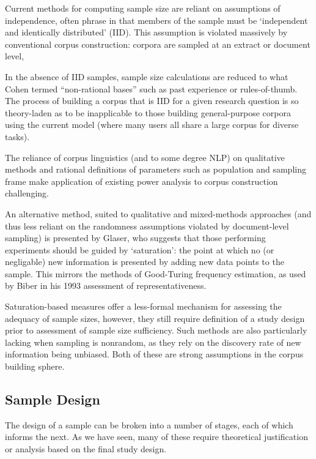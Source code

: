 Current methods for computing sample size are reliant on assumptions of independence, often phrase in that members of the sample must be `independent and identically distributed' (IID).  This assumption is violated massively by conventional corpus construction: corpora are sampled at an extract or document level, 

In the absence of IID samples, sample size calculations are reduced to what Cohen\cite[p. 145]{cohen1977statistical} termed ``non-rational bases'' such as past experience or rules-of-thumb.  The process of building a corpus that is IID for a given research question is so theory-laden as to be inapplicable to those building general-purpose corpora using the current model (where many users all share a large corpus for diverse tasks).

The reliance of corpus linguistics (and to some degree NLP) on qualitative methods and rational definitions of parameters such as population and sampling frame make application of existing power analysis to corpus construction challenging.

An alternative method, suited to qualitative and mixed-methods approaches (and thus less reliant on the randomness assumptions violated by document-level sampling) is presented by Glaser\cite{glaser1965qualitative}, who suggests that those performing experiments should be guided by `saturation': the point at which no (or negligable) new information is presented by adding new data points to the sample.  This mirrors the methods of Good-Turing frequency estimation\cite{GOOD01121953}, as used by Biber in his 1993 assessment of representativeness\cite{biber1993representativeness}.

Saturation-based measures offer a less-formal mechanism for assessing the adequacy of sample sizes, however, they still require definition of a study design prior to assessment of sample size sufficiency.  Such methods are also particularly lacking when sampling is nonrandom, as they rely on the discovery rate of new information being unbiased.  Both of these are strong assumptions in the corpus building sphere.



\sepline

\subsection{Sample Design}
The design of a sample can be broken into a number of stages, each of which informs the next.  As we have seen, many of these require theoretical justification or analysis based on the final study design.

